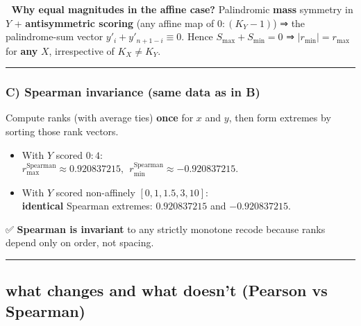 \documentclass[
  12pt,
]{article}
\theoremstyle{plain}
\theoremstyle{definition}
\theoremstyle{remark}
\begin{document}
🧠 \textbf{Why equal magnitudes in the affine case?} Palindromic
\textbf{mass} symmetry in \(Y\) + \textbf{antisymmetric scoring} (any
affine map of \(0{:}(K_Y-1)\)) ⇒ the palindrome-sum vector
\(y'_i+y'_{n+1-i}\equiv 0\). Hence \(S_{\max}+S_{\min}=0\) ⇒
\(|r_{\min}|=r_{\max}\) for \textbf{any} \(X\), irrespective of
\(K_X\neq K_Y\).

\begin{center}\rule{0.5\linewidth}{0.5pt}\end{center}

\subsubsection{\texorpdfstring{C) \textbf{Spearman invariance (same data
as in
B)}}{C) Spearman invariance (same data as in B)}}\label{c-spearman-invariance-same-data-as-in-b}

Compute ranks (with average ties) \textbf{once} for \(x\) and \(y\),
then form extremes by sorting those rank vectors.

\begin{itemize}
\item
  With \(Y\) scored \(0{:}4\):\\
  \(r_{\max}^{\text{Spearman}}\approx 0.920837215,\ \ r_{\min}^{\text{Spearman}}\approx -0.920837215\).
\item
  With \(Y\) scored non-affinely \([0,1,1.5,3,10]\):\\
  \textbf{identical} Spearman extremes: \(0.920837215\) and
  \(-0.920837215\).
\end{itemize}

✅ \textbf{Spearman is invariant} to any strictly monotone recode
because ranks depend only on order, not spacing.

\begin{center}\rule{0.5\linewidth}{0.5pt}\end{center}

\subsection{what changes and what doesn't (Pearson vs
Spearman)}\label{what-changes-and-what-doesnt-pearson-vs-spearman}
\end{document}
